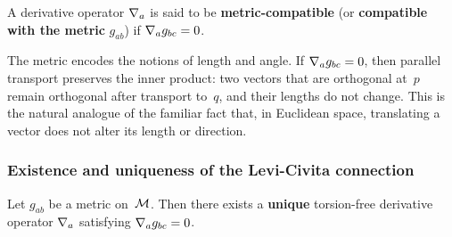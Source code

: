 \begin{definition}\label{def:metric-compat}
  A derivative operator $\nabla_a$ is said to be
  \textbf{metric-compatible} (or \textbf{compatible with the
  metric} $g_{ab}$) if $\nabla_a g_{bc} = 0$.
\end{definition}

\begin{intuition}
  The metric encodes the notions of length and angle.  If
  $\nabla_a g_{bc} = 0$, then parallel transport preserves the
  inner product: two vectors that are orthogonal at~$p$ remain
  orthogonal after transport to~$q$, and their lengths do not
  change.  This is the natural analogue of the familiar fact
  that, in Euclidean space, translating a vector does not alter
  its length or direction.
\end{intuition}

\subsubsection{Existence and uniqueness of the Levi-Civita
  connection}\label{sec:levi-civita-unique}

\begin{theorem}\label{thm:levi-civita}
  Let $g_{ab}$ be a metric on~$\mathcal{M}$.  Then there exists a
  \textbf{unique} torsion-free derivative operator $\nabla_a$
  satisfying $\nabla_a g_{bc} = 0$.
\end{theorem}

